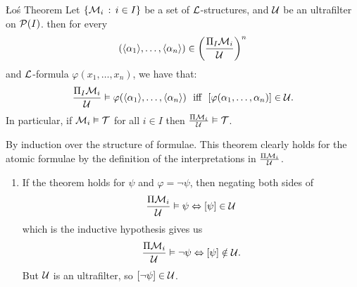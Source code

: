 \documentclass{article}
\numberwithin{thm}{subsection}
\begin{document}
\begin{fancythm}{\L o\'s Theorem}
    Let $\{ \mathcal{M}_{i} \, : \, i \in I\}$ be a set of $\mathcal{L}$-structures, and $\mathcal{U}$ be an ultrafilter on $\mathcal{P}(I)$. then for every \[ (\langle \alpha_{1} \rangle, \dots, \langle \alpha_{n} \rangle) \in \left( \frac{\Pi_{I} \mathcal{M}_{i}}{\mathcal{U}} \right)^{n}\] and $\mathcal{L}$-formula $\varphi(x_{1}, \dots, x_{n})$, we have that: \[ \frac{\Pi_{I} \mathcal{M}_{i}}{\mathcal{U}} \vDash \varphi(\langle \alpha_{1} \rangle, \dots, \langle \alpha_{n} \rangle) \,\,\,\, \text{iff} \, \,\,\, [\varphi(\alpha_{1}, \dots, \alpha_{n})] \in \mathcal{U}. \] 
    In particular, if $\mathcal{M}_{i} \vDash \mathcal{T}$ for all $i \in I$ then $\frac{\Pi \mathcal{M}_{i}}{\mathcal{U}} \vDash \mathcal{T}$. 
\end{fancythm}
\proof By induction over the structure of formulae. This theorem clearly holds for the atomic formulae by the definition of the interpretations in $\frac{\Pi \mathcal{M}_{i}}{\mathcal{U}}$. \begin{enumerate}
    \item[Negation.] If the theorem holds for $\psi$ and $\varphi = \neg \psi$, then negating both sides of \[ \frac{\Pi \mathcal{M}_{i}}{\mathcal{U}} \vDash \psi \Leftrightarrow [\psi] \in \mathcal{U} \] which is the inductive hypothesis gives us \[ \frac{\Pi \mathcal{M}_{i}}{\mathcal{U}} \vDash \neg \psi \Leftrightarrow [ \psi] \notin \mathcal{U}. \] But $\mathcal{U}$ is an ultrafilter, so $[\neg \psi] \in \mathcal{U}$.
    


\end{enumerate}
\end{document}
